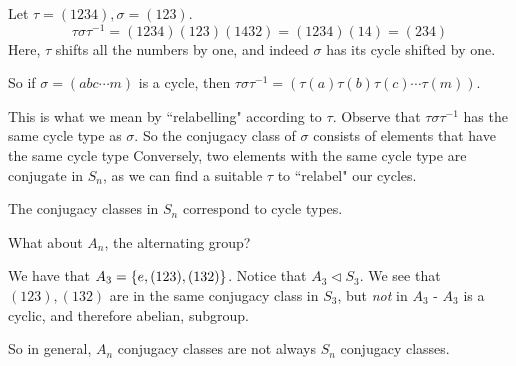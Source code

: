 \begin{xmp}[source=Primary Source Material]
    Let $ \tau = (1234), \sigma = (123) $.
    \begin{equation*}
        \tau\sigma\tau^{-1} = (1234)(123)(1432) = (1234)(14) = (234)
    \end{equation*}
    Here, $ \tau $ shifts all the numbers by one,
    and indeed $ \sigma $ has its cycle shifted by one.
\end{xmp}

So if $ \sigma = (abc\cdots m) $ is a cycle,
then $ \tau\sigma\tau^{-1} = (\tau(a)\tau(b)\tau(c)\cdots\tau(m)) $.

This is what we mean by ``relabelling" according to $ \tau $. \vsp
%
Observe that $ \tau\sigma\tau^{-1} $ has the same cycle type as $ \sigma $.
So the conjugacy class of $ \sigma $ consists of elements that have the same cycle type \vsp
%
Conversely, two elements with the same cycle type are conjugate in $ S_{n} $, as we can find a
suitable $ \tau $ to ``relabel" our cycles.

\begin{thm}
    The conjugacy classes in $ S_{n} $ correspond to cycle types.
\end{thm}

What about $ A_{n} $, the alternating group?

\begin{xmp}[source=Primary Source Material]
    We have that $ A_{3} = \left\{{e, (123), (132)}\right\} $.
    Notice that $ A_{3} \triangleleft S_{3} $. \vsp
    We see that $ (123), (132) $ are in the same conjugacy class in $ S_{3} $, but \textit{not} in
    $ A_{3} $ - $ A_{3} $ is a cyclic, and therefore abelian, subgroup.
\end{xmp}
So in general, $ A_{n} $ conjugacy classes are not always $ S_{n} $ conjugacy classes.


